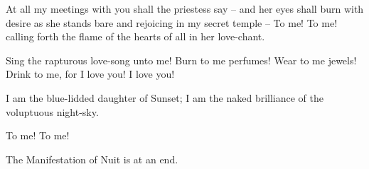At all my meetings with you shall the priestess say -- and her eyes shall burn with desire as she stands bare and rejoicing in my secret temple -- To me! To me! calling forth the flame of the hearts of all in her love-chant.

Sing the rapturous love-song unto me! Burn to me perfumes! Wear to me jewels! Drink to me, for I love you! I love you!

I am the blue-lidded daughter of Sunset; I am the naked brilliance of the voluptuous night-sky.

To me! To me!

The Manifestation of Nuit is at an end.